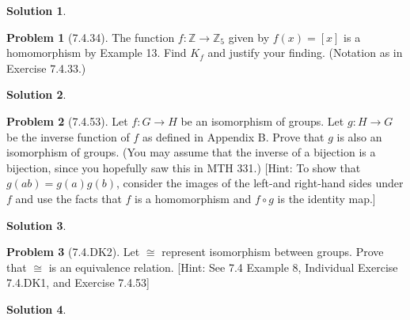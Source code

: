 \documentclass[12pt]{article}
\theoremstyle{definition}
\newtheorem*{prob}{Problem}
\newtheorem*{soln}{Solution}
\newcommand{\ZZ}{{\mathbb{Z}}}
\begin{document}
\begin{soln}

\end{soln}

\begin{prob}[7.4.34]
The function $f:\ZZ \to \ZZ_5$ given by $f(x) = [x]$ is a homomorphism by Example 13. 
Find $K_f$ 
and justify your finding. (Notation as in Exercise 7.4.33.)
\end{prob}

\begin{soln}

\end{soln}




\begin{prob}[7.4.53]
Let $f:G \to H$ be an isomorphism of  groups. Let $g:H \to G$ 
be the inverse function of  $f$ as defined in Appendix B. 
Prove that $g$ is also an isomorphism of  groups. 
(You may assume that the inverse of a bijection is a bijection, since
you hopefully saw this in MTH 331.)
[Hint: To show that $g(ab) = g(a)g(b)$, 
consider the images of  the left-and right-hand sides under $f$ and use the facts 
that $f$ is a homomorphism and $f \circ g$ is the identity map.]
\end{prob}

\begin{soln}

\end{soln}

\begin{prob}[7.4.DK2] Let $\cong$ represent isomorphism between groups.
Prove that $\cong$ is an equivalence relation.
[Hint: See 7.4 Example 8, Individual Exercise 7.4.DK1, and Exercise 7.4.53]
\end{prob}

\begin{soln}

\end{soln}
\end{document}
